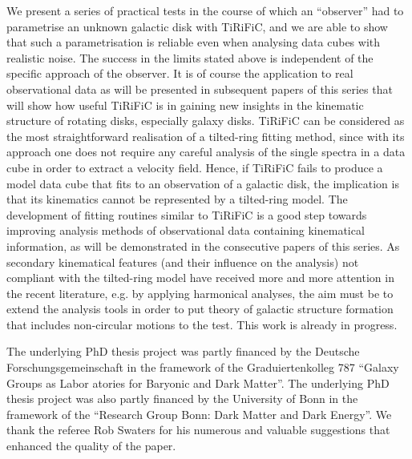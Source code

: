 \documentclass[oldversion]{aa}
\newcommand{\cng}[1]{{#1}}
\begin{document}
\cng{We present a series of practical tests in the course of which an ``observer'' had to parametrise an unknown galactic disk with TiRiFiC, and we are able to show that such a parametrisation is reliable even when analysing data cubes with realistic noise. The success in the limits stated above is independent of the specific approach of the observer.}
It is of course the application \cng{to} real observational data as will be
presented in subsequent papers of this series that will show how
useful TiRiFiC is in \cng{gaining} new insights in the kinematic
structure of rotating disks, especially galaxy disks.  TiRiFiC can be
considered as the most straightforward realisation of a tilted-ring
fitting \cng{method, since with its approach one does not require any careful analysis of the single spectra in a data cube in order to extract a velocity field}. Hence, if TiRiFiC fails to produce a model data cube
that fits to an observation of a galactic disk, the implication is
that its kinematics cannot be represented by a tilted-ring model.  The
development of fitting routines similar to TiRiFiC is a good step
\cng{towards} improving analysis methods of observational data containing
kinematical information, as will be demonstrated in the consecutive
papers of this series.  As secondary kinematical features (and
their influence on the analysis) not compliant with the tilted-ring
model \cng{have received} more and more attention in the recent literature, e.g. by applying harmonical analyses, the
aim must be to extend the analysis tools in order to put theory \cng{of galactic structure formation that includes non-circular motions} to the
test. This work is already in progress.
\begin{acknowledgements}
The underlying PhD thesis project was partly financed by the Deutsche
Forschungsgemeinschaft in the framework of the Graduiertenkolleg 787
``Galaxy Groups as Labor atories for Baryonic and Dark Matter''. 
The underlying PhD thesis project was also partly financed by the University of Bonn in the framework of the ``Research Group Bonn: Dark Matter and Dark Energy''.
We thank the referee Rob Swaters for his numerous and valuable suggestions that enhanced the quality of the paper. 
\end{acknowledgements}


\Online
\end{document}
